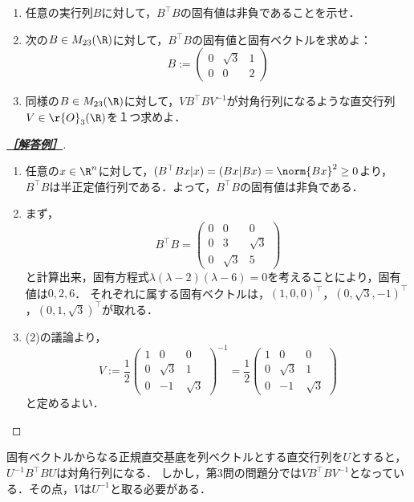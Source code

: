 \documentclass[uplatex,dvipdfmx]{jsarticle}
\begin{document}
\begin{tcolorbox}[colframe=ForestGreen, colback=ForestGreen!10!white,breakable,colbacktitle=ForestGreen!40!white,coltitle=black,fonttitle=\bfseries\sffamily,
    title=第２問]
    \begin{problem}\mbox{}
        \begin{enumerate}[{問}1]
            \item 任意の実行列$B$に対して，$B^\top B$の固有値は非負であることを示せ．
            \item 次の$B\in M_{23}(\R)$に対して，$B^\top B$の固有値と固有ベクトルを求めよ：
            \[B:=\begin{pmatrix}0&\sqrt{3}&1\\0&0&2\end{pmatrix}\]
            \item 同様の$B\in M_{23}(\R)$に対して，$VB^\top BV^{-1}$が対角行列になるような直交行列$V\in\r{O}_3(\R)$を１つ求めよ．
        \end{enumerate}
    \end{problem}
\end{tcolorbox}
\begin{proof}[\textbf{\underline{［解答例］}}]\mbox{}
    \begin{enumerate}
        \item 任意の$x\in\R^n$に対して，$(B^\top Bx|x)=(Bx|Bx)=\norm{Bx}^2\ge0$より，$B^\top B$は半正定値行列である．よって，$B^\top B$の固有値は非負である．
        \item まず，
        \[B^\top B=\begin{pmatrix}0&0&0\\0&3&\sqrt{3}\\0&\sqrt{3}&5\end{pmatrix}\]
        と計算出来，固有方程式$\lambda(\lambda-2)(\lambda-6)=0$を考えることにより，固有値は$0,2,6$．
        それぞれに属する固有ベクトルは，$(1,0,0)^\top$，$(0,\sqrt{3},-1)^\top$，$(0,1,\sqrt{3})^\top$が取れる．
        \item (2)の議論より，
        \[V:=\frac{1}{2}\begin{pmatrix}1&0&0\\0&\sqrt{3}&1\\0&-1&\sqrt{3}\end{pmatrix}^{-1}=\frac{1}{2}\begin{pmatrix}1&0&0\\0&\sqrt{3}&1\\0&-1&\sqrt{3}\end{pmatrix}\]
        と定めるよい．
    \end{enumerate}
\end{proof}
\begin{remark*}
    固有ベクトルからなる正規直交基底を列ベクトルとする直交行列を$U$とすると，$U^{-1}B^\top BU$は対角行列になる．
    しかし，第3問の問題分では$VB^\top BV^{-1}$となっている．その点，$V$は$U^{-1}$と取る必要がある．
\end{remark*}
\end{document}
